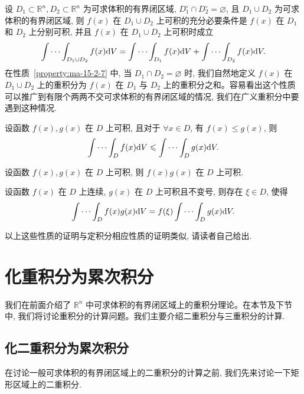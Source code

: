 \begin{property}\label{property:ma-15-2-7}
设 $D_1\subset\mathbb R^n,D_2\subset\mathbb R^n$ 为可求体积的有界闭区域, $D_1^\circ\cap D_2^\circ=\varnothing$, 且 $D_1\cup D_2$ 为可求体积的有界闭区域, 则 $f(x)$ 在 $D_1\cup D_2$ 上可积的充分必要条件是 $f(x)$ 在 $D_1$ 和 $D_2$ 上分别可积, 并且 $f(x)$ 在 $D_1\cup D_2$ 上可积时成立
\[
  \idotsint_{D_1\cup D_2}f(x)\mathrm dV
  =\idotsint_{D_1}f(x)\mathrm dV+\idotsint_{D_2}f(x)\mathrm dV.
\]
在性质~\ref{property:ma-15-2-7} 中, 当 $D_1\cap D_2=\varnothing$ 时, 我们自然地定义 $f(x)$ 在 $D_1\cup D_2$ 上的重积分为 $f(x)$ 在 $D_1$ 与 $D_2$ 上的重积分之和。容易看出这个性质可以推广到有限个两两不交可求体积的有界闭区域的情况, 我们在广义重积分中要遇到这种情况.
\end{property}


\begin{property}\label{property:ma-15-2-8}
设函数 $f(x),g(x)$ 在 $D$ 上可积, 且对于 $\forall x\in D$, 有 $f(x)\leqslant g(x)$, 则
\[
  \idotsint_D f(x)\mathrm dV\leqslant\idotsint_D g(x)\mathrm dV.
\]
\end{property}


\begin{property}\label{property:ma-15-2-9}
设函数 $f(x),g(x)$ 在 $D$ 上可积, 则 $f(x)g(x)$ 在 $D$ 上可积.
\end{property}


\begin{property}[{重积分第一中值定理}]\label{property:ma-15-2-10}
设函数 $f(x)$ 在 $D$ 上连续, $g(x)$ 在 $D$ 上可积且不变号, 则存在 $\xi\in D$, 使得
\[
  \idotsint_D f(x)g(x)\mathrm dV=f(\xi)\idotsint_D g(x)\mathrm dV.
\]
\end{property}

以上这些性质的证明与定积分相应性质的证明类似, 请读者自己给出.

\section{化重积分为累次积分}
\label{sec:ma-15-3}

我们在前面介绍了 $\mathbb R^n$ 中可求体积的有界闭区域上的重积分理论。在本节及下节中, 我们将讨论重积分的计算问题。我们主要介绍二重积分与三重积分的计算.

\subsection{化二重积分为累次积分}
\label{subsec:ma-15-3-1}

在讨论一般可求体积的有界闭区域上的二重积分的计算之前, 我们先来讨论一下矩形区域上的二重积分.

